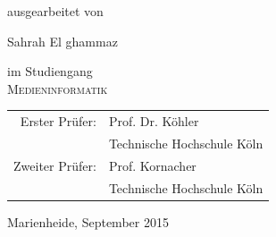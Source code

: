 \begin{titlepage}
\begin{center}
\vspace{0.7cm}

\begin{large}
ausgearbeitet von\\ 
\vspace{0.2cm}
\begin{LARGE}
Sahrah El ghammaz\\
\end{LARGE}
\end{large}


\vspace{0.4cm}

\begin{large}
im Studiengang\\ 
\vspace{0.2cm}
\textsc{Medieninformatik}
\end{large}

\vspace{0.6cm}

\begin{tabular}{rl}
        Erster Prüfer:  &  Prof. Dr. Köhler\\
       							    &  \small Technische Hochschule Köln \\[1.0em]
       Zweiter Prüfer:  &  Prof. Kornacher\\
       							    &  \small Technische Hochschule Köln
\end{tabular}

\vspace{0.6cm}

\begin{large}
Marienheide, September 2015
\end{large}

\end{center}



\end{titlepage}
